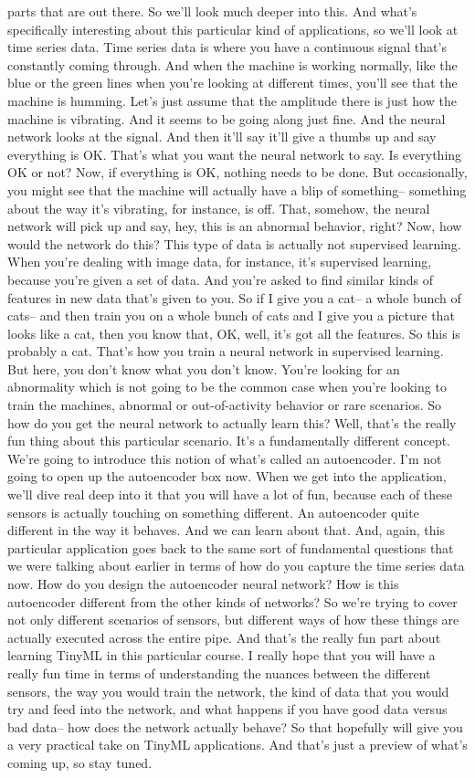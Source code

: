 parts that are out there.
So we'll look much deeper into this.
And what's specifically interesting about this particular kind
of applications, so we'll look at time series data.
Time series data is where you have a continuous signal that's
constantly coming through.
And when the machine is working normally,
like the blue or the green lines when you're looking at different times,
you'll see that the machine is humming.
Let's just assume that the amplitude there
is just how the machine is vibrating.
And it seems to be going along just fine.
And the neural network looks at the signal.
And then it'll say it'll give a thumbs up and say everything is OK.
That's what you want the neural network to say.
Is everything OK or not?
Now, if everything is OK, nothing needs to be done.
But occasionally, you might see that the machine will actually
have a blip of something-- something about the way it's vibrating,
for instance, is off.
That, somehow, the neural network will pick up and say, hey,
this is an abnormal behavior, right?
Now, how would the network do this?
This type of data is actually not supervised learning.
When you're dealing with image data, for instance, it's supervised learning,
because you're given a set of data.
And you're asked to find similar kinds of features in new data
that's given to you.
So if I give you a cat--
a whole bunch of cats-- and then train you on a whole bunch of cats
and I give you a picture that looks like a cat, then you know that, OK, well,
it's got all the features.
So this is probably a cat.
That's how you train a neural network in supervised learning.
But here, you don't know what you don't know.
You're looking for an abnormality which is not
going to be the common case when you're looking
to train the machines, abnormal or out-of-activity behavior
or rare scenarios.
So how do you get the neural network to actually learn this?
Well, that's the really fun thing about this particular scenario.
It's a fundamentally different concept.
We're going to introduce this notion of what's called an autoencoder.
I'm not going to open up the autoencoder box now.
When we get into the application, we'll dive real deep into it
that you will have a lot of fun, because each of these sensors
is actually touching on something different.
An autoencoder quite different in the way it behaves.
And we can learn about that.
And, again, this particular application goes back
to the same sort of fundamental questions
that we were talking about earlier in terms of how do
you capture the time series data now.
How do you design the autoencoder neural network?
How is this autoencoder different from the other kinds of networks?
So we're trying to cover not only different scenarios of sensors,
but different ways of how these things are actually
executed across the entire pipe.
And that's the really fun part about learning
TinyML in this particular course.
I really hope that you will have a really fun time in terms
of understanding the nuances between the different sensors, the way
you would train the network, the kind of data
that you would try and feed into the network,
and what happens if you have good data versus bad data--
how does the network actually behave?
So that hopefully will give you a very practical take on TinyML applications.
And that's just a preview of what's coming up, so stay tuned.

